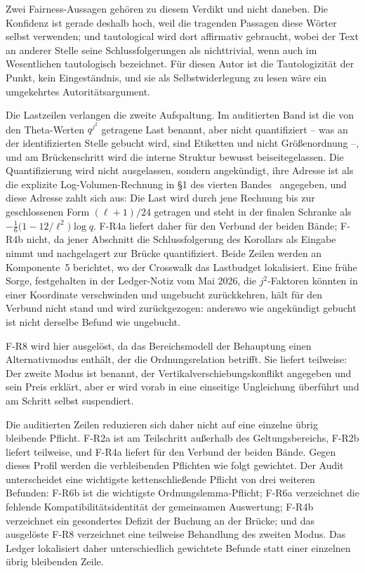 \documentclass[11pt,a4paper]{article}
\begin{document}
Zwei Fairness-Aussagen gehören zu diesem Verdikt und nicht daneben. Die
Konfidenz ist gerade deshalb hoch, weil die tragenden Passagen diese Wörter
selbst verwenden; und \glqq tautological\grqq{} wird dort affirmativ gebraucht, wobei
der Text an anderer Stelle seine Schlussfolgerungen als nichttrivial, wenn
auch im Wesentlichen tautologisch bezeichnet. Für diesen Autor ist die
Tautologizität der Punkt, kein Eingeständnis, und sie als Selbstwiderlegung
zu lesen wäre ein umgekehrtes Autoritätsargument.

Die Lastzeilen verlangen die zweite Aufspaltung. Im auditierten Band ist die
von den Theta-Werten $q^{j^2}$ getragene Last benannt, aber nicht
quantifiziert -- was an der identifizierten Stelle gebucht wird, sind
Etiketten und nicht Größenordnung --, und am Brückenschritt wird die interne
Struktur bewusst beiseitegelassen. Die Quantifizierung wird nicht
ausgelassen, sondern angekündigt, ihre Adresse ist als die explizite
Log-Volumen-Rechnung in \S1 des vierten Bandes~\cite{Mochizuki2021d}
angegeben, und diese Adresse zahlt sich aus: Die Last wird durch jene
Rechnung bis zur geschlossenen Form $(\ell+1)/24$ getragen und steht in der
finalen Schranke als
$-\tfrac{1}{6}\bigl(1-12/\ell^{2}\bigr)\log q$. F-R4a liefert daher für den
Verbund der beiden Bände; F-R4b nicht, da jener Abschnitt die
Schlussfolgerung des Korollars als Eingabe nimmt und nachgelagert zur Brücke
quantifiziert. Beide Zeilen werden an Komponente~5 berichtet, wo der Crosswalk
das Lastbudget lokalisiert. Eine frühe Sorge, festgehalten in der
Ledger-Notiz vom Mai 2026, die $j^2$-Faktoren könnten in einer Koordinate
verschwinden und ungebucht zurückkehren, hält für den Verbund nicht stand und
wird zurückgezogen: anderswo wie angekündigt gebucht ist nicht derselbe
Befund wie ungebucht.

F-R8 wird hier ausgelöst, da das Bereichsmodell der Behauptung einen
Alternativmodus enthält, der die Ordnungsrelation betrifft. Sie liefert
teilweise: Der zweite Modus ist benannt, der Vertikalverschiebungskonflikt
angegeben und sein Preis erklärt, aber er wird vorab in eine einseitige
Ungleichung überführt und am Schritt selbst suspendiert.

Die auditierten Zeilen reduzieren sich daher nicht auf eine einzelne übrig
bleibende Pflicht. F-R2a ist am Teilschritt außerhalb des Geltungsbereichs,
F-R2b liefert teilweise, und F-R4a liefert für den Verbund der beiden Bände.
Gegen dieses Profil werden die verbleibenden Pflichten wie folgt gewichtet.
Der Audit unterscheidet eine wichtigste kettenschließende Pflicht von drei
weiteren Befunden: F-R6b ist die wichtigste Ordnungslemma-Pflicht; F-R6a
verzeichnet die fehlende Kompatibilitätsidentität der gemeinsamen
Auswertung; F-R4b verzeichnet ein gesondertes Defizit der Buchung an der
Brücke; und das ausgelöste F-R8 verzeichnet eine teilweise Behandlung des
zweiten Modus. Das Ledger lokalisiert daher unterschiedlich gewichtete
Befunde statt einer einzelnen übrig bleibenden Zeile.
\end{document}
